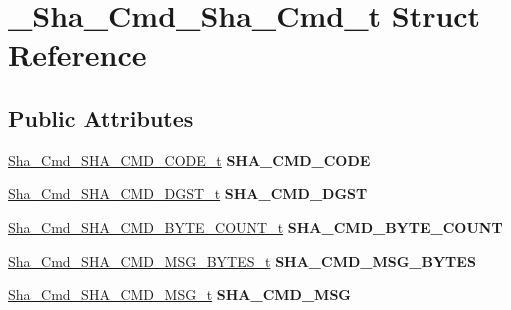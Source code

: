 \hypertarget{struct__Sha__Cmd__Sha__Cmd__t}{\section{\-\_\-\-Sha\-\_\-\-Cmd\-\_\-\-Sha\-\_\-\-Cmd\-\_\-t Struct Reference}
\label{struct__Sha__Cmd__Sha__Cmd__t}
}
\subsection*{Public Attributes}
\begin{DoxyCompactItemize}
\item 
\hypertarget{struct__Sha__Cmd__Sha__Cmd__t_ac62f5db1b2f37d03d204f976253f2431}{\hyperlink{union__Sha__Cmd__SHA__CMD__CODE__t}{Sha\-\_\-\-Cmd\-\_\-\-S\-H\-A\-\_\-\-C\-M\-D\-\_\-\-C\-O\-D\-E\-\_\-t} {\bfseries S\-H\-A\-\_\-\-C\-M\-D\-\_\-\-C\-O\-D\-E}}\label{struct__Sha__Cmd__Sha__Cmd__t_ac62f5db1b2f37d03d204f976253f2431}

\item 
\hypertarget{struct__Sha__Cmd__Sha__Cmd__t_ab1809e20ca1fb3b3b85ed0252577385f}{\hyperlink{union__Sha__Cmd__SHA__CMD__DGST__t}{Sha\-\_\-\-Cmd\-\_\-\-S\-H\-A\-\_\-\-C\-M\-D\-\_\-\-D\-G\-S\-T\-\_\-t} {\bfseries S\-H\-A\-\_\-\-C\-M\-D\-\_\-\-D\-G\-S\-T}}\label{struct__Sha__Cmd__Sha__Cmd__t_ab1809e20ca1fb3b3b85ed0252577385f}

\item 
\hypertarget{struct__Sha__Cmd__Sha__Cmd__t_aa285e9cad910b14c49213435d8a0330c}{\hyperlink{union__Sha__Cmd__SHA__CMD__BYTE__COUNT__t}{Sha\-\_\-\-Cmd\-\_\-\-S\-H\-A\-\_\-\-C\-M\-D\-\_\-\-B\-Y\-T\-E\-\_\-\-C\-O\-U\-N\-T\-\_\-t} {\bfseries S\-H\-A\-\_\-\-C\-M\-D\-\_\-\-B\-Y\-T\-E\-\_\-\-C\-O\-U\-N\-T}}\label{struct__Sha__Cmd__Sha__Cmd__t_aa285e9cad910b14c49213435d8a0330c}

\item 
\hypertarget{struct__Sha__Cmd__Sha__Cmd__t_acbee549cd63a5b6f61f2f90b7b289cfd}{\hyperlink{union__Sha__Cmd__SHA__CMD__MSG__BYTES__t}{Sha\-\_\-\-Cmd\-\_\-\-S\-H\-A\-\_\-\-C\-M\-D\-\_\-\-M\-S\-G\-\_\-\-B\-Y\-T\-E\-S\-\_\-t} {\bfseries S\-H\-A\-\_\-\-C\-M\-D\-\_\-\-M\-S\-G\-\_\-\-B\-Y\-T\-E\-S}}\label{struct__Sha__Cmd__Sha__Cmd__t_acbee549cd63a5b6f61f2f90b7b289cfd}

\item 
\hypertarget{struct__Sha__Cmd__Sha__Cmd__t_a56cb6580f3c7f06f2dc1dd0a78bc0871}{\hyperlink{union__Sha__Cmd__SHA__CMD__MSG__t}{Sha\-\_\-\-Cmd\-\_\-\-S\-H\-A\-\_\-\-C\-M\-D\-\_\-\-M\-S\-G\-\_\-t} {\bfseries S\-H\-A\-\_\-\-C\-M\-D\-\_\-\-M\-S\-G}}\label{struct__Sha__Cmd__Sha__Cmd__t_a56cb6580f3c7f06f2dc1dd0a78bc0871}


\end{DoxyCompactItemize}
